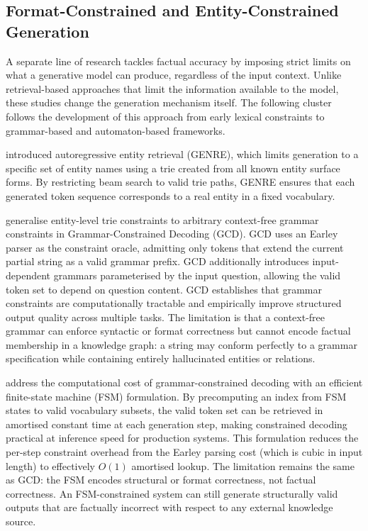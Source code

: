 \subsection{Format-Constrained and Entity-Constrained Generation}

A separate line of research tackles factual accuracy by imposing strict limits on what a generative model can produce, regardless of the input context. Unlike retrieval-based approaches that limit the information available to the model, these studies change the generation mechanism itself. The following cluster follows the development of this approach from early lexical constraints to grammar-based and automaton-based frameworks.

\citet{decao2021autoregressive} introduced autoregressive entity retrieval (GENRE), which limits generation to a specific set of entity names using a trie created from all known entity surface forms. By restricting beam search to valid trie paths, GENRE ensures that each generated token sequence corresponds to a real entity in a fixed vocabulary.

\citet{geng2023grammarconstrained} generalise entity-level trie constraints to arbitrary context-free grammar constraints in Grammar-Constrained Decoding (GCD). GCD uses an Earley parser as the constraint oracle, admitting only tokens that extend the current partial string as a valid grammar prefix. GCD additionally introduces input-dependent grammars parameterised by the input question, allowing the valid token set to depend on question content. GCD establishes that grammar constraints are computationally tractable and empirically improve structured output quality across multiple tasks. The limitation is that a context-free grammar can enforce syntactic or format correctness but cannot encode factual membership in a knowledge graph: a string may conform perfectly to a grammar specification while containing entirely hallucinated entities or relations.

\citet{willard2023outlines} address the computational cost of grammar-constrained decoding with an efficient finite-state machine (FSM) formulation. By precomputing an index from FSM states to valid vocabulary subsets, the valid token set can be retrieved in amortised constant time at each generation step, making constrained decoding practical at inference speed for production systems. This formulation reduces the per-step constraint overhead from the Earley parsing cost (which is cubic in input length) to effectively $O(1)$ amortised lookup. The limitation remains the same as GCD: the FSM encodes structural or format correctness, not factual correctness. An FSM-constrained system can still generate structurally valid outputs that are factually incorrect with respect to any external knowledge source.

